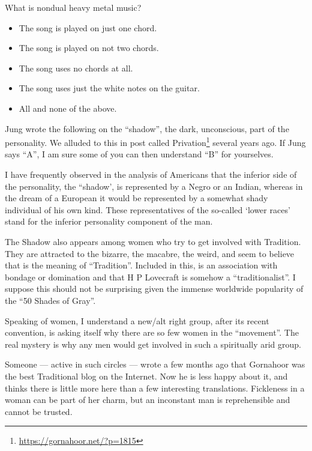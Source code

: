 What is nondual heavy metal music?

\begin{itemize}


\item The song is played on just one chord.

\item The song is played on not two chords.

\item The song uses no chords at all.

\item The song uses just the white notes on the guitar.

\item All and none of the above.
\end{itemize}

Jung wrote the following on the ``shadow'', the dark, unconscious, part of the personality. We alluded to this in post called Privation\footnote{\url{https://gornahoor.net/?p=1815}} several years ago. If Jung says ``A'', I am sure some of you can then understand ``B'' for yourselves.

\begin{quotex}
I have frequently observed in the analysis of Americans that the inferior side of the personality, the ``shadow', is represented by a Negro or an Indian, whereas in the dream of a European it would be represented by a somewhat shady individual of his own kind. These representatives of the so-called `lower races' stand for the inferior personality component of the man.
\end{quotex}


The Shadow also appears among women who try to get involved with Tradition. They are attracted to the bizarre, the macabre, the weird, and seem to believe that is the meaning of ``Tradition''. Included in this, is an association with bondage or domination and that H P Lovecraft is somehow a ``traditionalist''. I suppose this should not be surprising given the immense worldwide popularity of the ``50 Shades of Gray''.

Speaking of women, I understand a new/alt right group, after its recent convention, is asking itself why there are so few women in the ``movement''. The real mystery is why any men would get involved in such a spiritually arid group.

Someone --- active in such circles --- wrote a few months ago that Gornahoor was the best Traditional blog on the Internet. Now he is less happy about it, and thinks there is little more here than a few interesting translations. Fickleness in a woman can be part of her charm, but an inconstant man is reprehensible and cannot be trusted.

